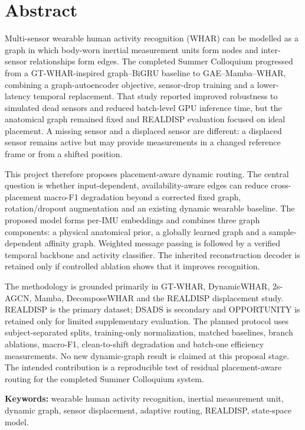 \documentclass[12pt,a4paper,twoside,openright]{report}
\begin{document}
\chapter*{Abstract}
\vspace{0.5cm}
\noindent
Multi-sensor wearable human activity recognition (WHAR) can be modelled as a graph in which body-worn inertial measurement units form nodes and inter-sensor relationships form edges. The completed Summer Colloquium progressed from a GT-WHAR-inspired graph--BiGRU baseline to GAE--Mamba--WHAR, combining a graph-autoencoder objective, sensor-drop training and a lower-latency temporal replacement. That study reported improved robustness to simulated dead sensors and reduced batch-level GPU inference time, but the anatomical graph remained fixed and REALDISP evaluation focused on ideal placement. A missing sensor and a displaced sensor are different: a displaced sensor remains active but may provide measurements in a changed reference frame or from a shifted position.

This project therefore proposes placement-aware dynamic routing. The central question is whether input-dependent, availability-aware edges can reduce cross-placement macro-F1 degradation beyond a corrected fixed graph, rotation/dropout augmentation and an existing dynamic wearable baseline. The proposed model forms per-IMU embeddings and combines three graph components: a physical anatomical prior, a globally learned graph and a sample-dependent affinity graph. Weighted message passing is followed by a verified temporal backbone and activity classifier. The inherited reconstruction decoder is retained only if controlled ablation shows that it improves recognition.

The methodology is grounded primarily in GT-WHAR, DynamicWHAR, 2s-AGCN, Mamba, DecomposeWHAR and the REALDISP displacement study. REALDISP is the primary dataset; DSADS is secondary and OPPORTUNITY is retained only for limited supplementary evaluation. The planned protocol uses subject-separated splits, training-only normalization, matched baselines, branch ablations, macro-F1, clean-to-shift degradation and batch-one efficiency measurements. No new dynamic-graph result is claimed at this proposal stage. The intended contribution is a reproducible test of residual placement-aware routing for the completed Summer Colloquium system.

\textbf{Keywords:} wearable human activity recognition, inertial measurement unit, dynamic graph, sensor displacement, adaptive routing, REALDISP, state-space model.
\end{document}
